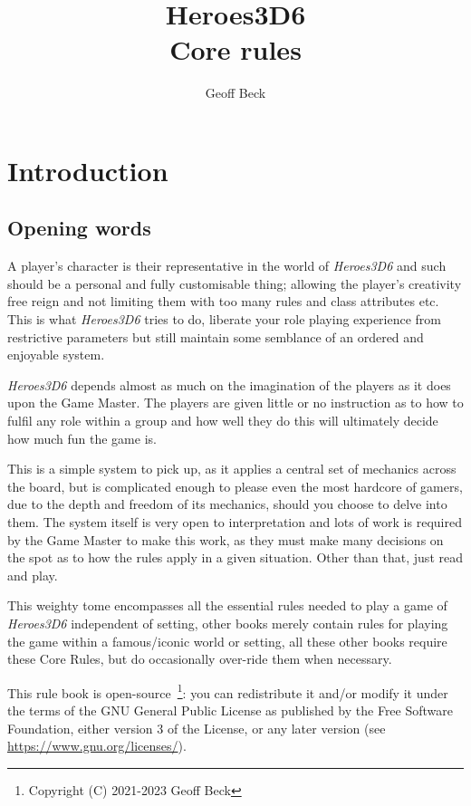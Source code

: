 \documentclass[a4paper,10pt,oneside]{book}
\title{\textbf{\huge Heroes3D6\\Core rules}}
\author{Geoff Beck}
\date{}
\begin{document}
\maketitle
\frontmatter
\tableofcontents
\mainmatter

\chapter{Introduction}

\section{Opening words}
A player's character is their representative in the world of \textit{Heroes3D6} and such should be a personal and fully customisable thing; allowing the player's creativity free reign and not limiting them with too many rules and class attributes etc. This is what \textit{Heroes3D6} tries to do, liberate your role playing experience from restrictive parameters but still maintain some semblance of an ordered and enjoyable system.

\textit{Heroes3D6} depends almost as much on the imagination of the players as it does upon the Game Master. The players are given little or no instruction as to how to fulfil any role within a group and how well they do this will ultimately decide how much fun the game is.

This is a simple system to pick up, as it applies a central set of mechanics across the board, but is complicated enough to please even the most hardcore of gamers, due to the depth and freedom of its mechanics, should you choose to delve into them. The system itself is very open to interpretation and lots of work is required by the Game Master to make this work, as they must make many decisions on the spot as to how the rules apply in a given situation. Other than that, just read and play.

This weighty tome encompasses all the essential rules needed to play a game of \textit{Heroes3D6} independent of setting, other books merely contain rules for playing the game within a famous/iconic world or setting, all these other books require these Core Rules, but do occasionally over-ride them when necessary.

This rule book is open-source~\footnote{Copyright (C) 2021-2023  Geoff Beck}: you can redistribute it and/or modify
it under the terms of the GNU General Public License as published by
the Free Software Foundation, either version 3 of the License, or any later version (see \url{https://www.gnu.org/licenses/}).
\end{document}
